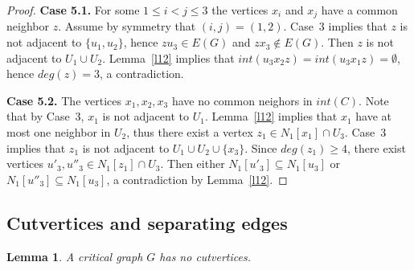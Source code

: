 \documentclass[12pt]{article}
\newtheorem{lemma}{Lemma}
\begin{document}
\begin{proof}
\textbf{Case 5.1.}  For some $1 \leq i < j \leq 3$ the vertices $x_i$ and $x_j$ have a common neighbor $z$. Assume by symmetry that $(i,j) = (1,2)$. Case~3 implies that $z$ is not adjacent to $\{u_1,u_2\}$, hence $zu_3 \in E(G)$ and $zx_3 \notin E(G)$. Then $z$ is not adjacent to $U_1 \cup U_2$. Lemma~\ref{l12} implies that $int(u_3x_2z) = int(u_3x_1z) = \emptyset$, hence $deg(z) = 3$, a contradiction.

\textbf{Case 5.2.} The vertices $x_1,x_2,x_3$ have no common neighors in $int(C)$. Note that by Case~3, $x_1$ is not adjacent to $U_1$. Lemma~\ref{l12} implies that $x_1$ have at most one neighbor in $U_2$, thus there exist a vertex $z_1 \in N_1[x_1] \cap U_3$. Case~3 implies that $z_1$ is not adjacent to $U_1 \cup U_2 \cup \{x_3\}$. Since $deg(z_1) \geq 4$, there exist vertices $u'_3,u''_3 \in N_1[z_1] \cap U_3$. Then either $N_1[u'_3] \subseteq N_1[u_3]$ or $N_1[u''_3] \subseteq N_1[u_3]$, a contradiction by Lemma~\ref{l12}. 
\end{proof}

\subsection{Cutvertices and separating edges}\label{s43}

\begin{lemma}\label{l16}
A critical graph $G$ has no cutvertices.
\end{lemma}
\end{document}
